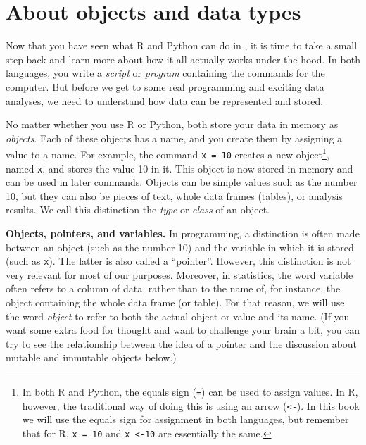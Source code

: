 \newcommand{\fnarrow}{\footnote{In both R and Python, the equals
  sign (\texttt{=}) can be used to assign values. In R, however, the
  traditional way of doing this is using an arrow (\texttt{\textless-}). In
  this book we will use the equals sign for assignment in both
  languages, but remember that for R, \texttt{x = 10} and
  \texttt{x \textless-10} are essentially the same.}}


\section{About objects and data types}
\label{sec:datatypes}

Now that you have seen what R and Python can do in ,
it is time to take a small step back and learn more about how it all actually works under the hood.
In both languages, you write a
\emph{script} or \emph{program} containing the commands for the
computer.  But before we get to
some real programming and exciting data analyses, we need to understand
how data can be represented and stored.

No matter whether you use R or Python, both store your data in memory as \emph{objects}.
Each of these objects has a name, and you create them by
assigning a value to a name. For example, the command \texttt{x = 10}
creates a new object\fnarrow, named \texttt{x}, and stores the value 10
in it.  This object is now stored in memory and can be used in later
commands. Objects can be simple values such as the number 10, but they can also
be pieces of text, whole data frames (tables), or analysis results.
We call this distinction the \emph{type} or \emph{class} of an
object. 

\begin{feature}
\textbf{Objects, pointers, and variables.} In programming, a distinction is
  often made between an object (such as the number 10) and the
  variable in which it is stored (such as \texttt{x}). The latter is also called a ``pointer''.
  However, this distinction is not very relevant for most of our
  purposes. Moreover, in statistics, the word variable often refers to a
  column of data, rather than to the name of, for instance, the object
  containing the whole data frame (or table).  For that
  reason, we will use the word \emph{object} to refer to both the
  actual object or value and its name. (If you want some extra food
  for thought and want to challenge your brain
  a bit, you can try to see the relationship between the idea of a pointer and
  the discussion about mutable and immutable objects below.)
\end{feature}

